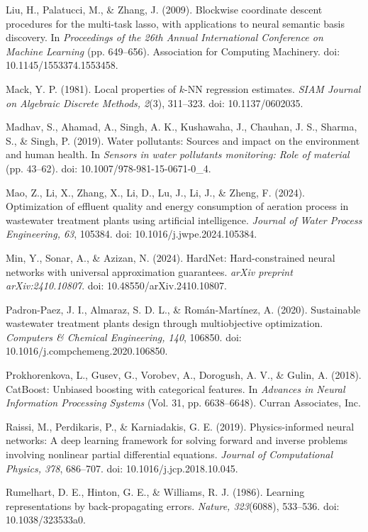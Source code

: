 \documentclass[a4paper,fleqn]{cas-sc}
\begin{document}
\noindent Liu, H., Palatucci, M., \& Zhang, J. (2009). Blockwise coordinate descent procedures for the multi-task lasso, with applications to neural semantic basis discovery. In \textit{Proceedings of the 26th Annual International Conference on Machine Learning} (pp. 649--656). Association for Computing Machinery. doi: 10.1145/1553374.1553458.

\noindent Mack, Y. P. (1981). Local properties of $k$-NN regression estimates. \textit{SIAM Journal on Algebraic Discrete Methods, 2}(3), 311--323. doi: 10.1137/0602035.

\noindent Madhav, S., Ahamad, A., Singh, A. K., Kushawaha, J., Chauhan, J. S., Sharma, S., \& Singh, P. (2019). Water pollutants: Sources and impact on the environment and human health. In \textit{Sensors in water pollutants monitoring: Role of material} (pp. 43--62). doi: 10.1007/978-981-15-0671-0\_4.

\noindent Mao, Z., Li, X., Zhang, X., Li, D., Lu, J., Li, J., \& Zheng, F. (2024). Optimization of effluent quality and energy consumption of aeration process in wastewater treatment plants using artificial intelligence. \textit{Journal of Water Process Engineering, 63}, 105384. doi: 10.1016/j.jwpe.2024.105384.

\noindent Min, Y., Sonar, A., \& Azizan, N. (2024). HardNet: Hard-constrained neural networks with universal approximation guarantees. \textit{arXiv preprint arXiv:2410.10807}. doi: 10.48550/arXiv.2410.10807.

\noindent Padron-Paez, J. I., Almaraz, S. D. L., \& Rom\'an-Mart\'inez, A. (2020). Sustainable wastewater treatment plants design through multiobjective optimization. \textit{Computers \& Chemical Engineering, 140}, 106850. doi: 10.1016/j.compchemeng.2020.106850.

\noindent Prokhorenkova, L., Gusev, G., Vorobev, A., Dorogush, A. V., \& Gulin, A. (2018). CatBoost: Unbiased boosting with categorical features. In \textit{Advances in Neural Information Processing Systems} (Vol. 31, pp. 6638--6648). Curran Associates, Inc.

\noindent Raissi, M., Perdikaris, P., \& Karniadakis, G. E. (2019). Physics-informed neural networks: A deep learning framework for solving forward and inverse problems involving nonlinear partial differential equations. \textit{Journal of Computational Physics, 378}, 686--707. doi: 10.1016/j.jcp.2018.10.045.

\noindent Rumelhart, D. E., Hinton, G. E., \& Williams, R. J. (1986). Learning representations by back-propagating errors. \textit{Nature, 323}(6088), 533--536. doi: 10.1038/323533a0.
\end{document}
